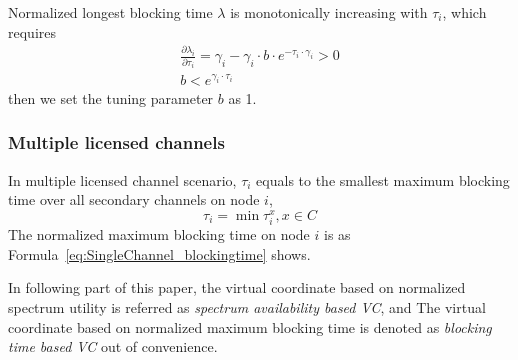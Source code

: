 
Normalized longest blocking time $\lambda$ is monotonically increasing with $\tau_i$, which requires
\begin{equation}
\begin{split}
\frac{\partial\lambda_i}{\partial\tau_i}=\gamma_i-\gamma_i\cdot b\cdot e^{-\tau_i\cdot \gamma_i}  >0\\
b  < e^{\gamma_i\cdot \tau_i}
\end{split}
\end{equation}
then we set the tuning parameter $b$ as 1.

\subsubsection*{Multiple licensed channels}
In multiple licensed channel scenario, $\tau_i$ equals to the smallest maximum blocking time over all secondary channels on node $i$, 
\begin{equation}
\tau_i = \min \tau_i^x, x\in C
\end{equation}
The normalized maximum blocking time on node $i$ is as Formula~\ref{eq:SingleChannel_blockingtime} shows.





In following part of this paper, the virtual coordinate based on normalized spectrum utility is referred as \textit{spectrum availability based VC}, and The virtual coordinate based on normalized maximum blocking time is denoted as \textit{blocking time based VC} out of convenience.


